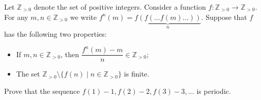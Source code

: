 Let $\mathbb{Z}_{>0}$ denote the set of positive integers. Consider a function $f \colon \mathbb{Z}_{>0} \to \mathbb{Z}_{>0}$. For any $m, n \in \mathbb{Z}_{>0}$ we write $f^n(m) = \underbrace{f(f(\ldots f(m) \ldots))}_{n}$. Suppose that $f$ has the following two properties:
\begin{itemize}
\item[(i)] If $m, n \in \mathbb{Z}_{>0}$, then $\dfrac{f^n(m) - m}{n} \in \mathbb{Z}_{>0}$;
\item[(ii)] The set $\mathbb{Z}_{>0} \setminus \{ f(n) \mid n \in \mathbb{Z}_{>0} \}$ is finite.
\end{itemize}
Prove that the sequence $f(1) - 1, f(2) - 2, f(3) - 3, \ldots$ is periodic.
